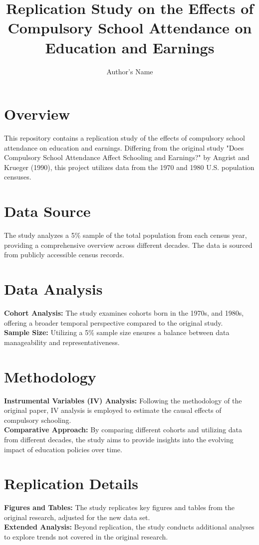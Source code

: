 \documentclass{article}
\title{Replication Study on the Effects of Compulsory School Attendance on Education and Earnings}
\author{Author's Name}
\date{}
\begin{document}
\maketitle

\section*{Overview}
This repository contains a replication study of the effects of compulsory school attendance on education and earnings. Differing from the original study "Does Compulsory School Attendance Affect Schooling and Earnings?" by Angrist and Krueger (1990), this project utilizes data from the 1970 and 1980 U.S. population censuses.

\section*{Data Source}
The study analyzes a 5\% sample of the total population from each census year, providing a comprehensive overview across different decades. The data is sourced from publicly accessible census records.

\section*{Data Analysis}
\textbf{Cohort Analysis:} The study examines cohorts born in the 1970s, and 1980s, offering a broader temporal perspective compared to the original study.\\
\textbf{Sample Size:} Utilizing a 5\% sample size ensures a balance between data manageability and representativeness.

\section*{Methodology}
\textbf{Instrumental Variables (IV) Analysis:} Following the methodology of the original paper, IV analysis is employed to estimate the causal effects of compulsory schooling.\\
\textbf{Comparative Approach:} By comparing different cohorts and utilizing data from different decades, the study aims to provide insights into the evolving impact of education policies over time.

\section*{Replication Details}
\textbf{Figures and Tables:} The study replicates key figures and tables from the original research, adjusted for the new data set.\\
\textbf{Extended Analysis:} Beyond replication, the study conducts additional analyses to explore trends not covered in the original research.
\end{document}
